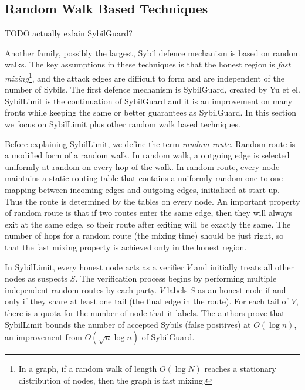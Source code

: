 \subsection{Random Walk Based Techniques}\label{sec:random-walk}
TODO actually exlain SybilGuard?

Another family, possibly the largest, Sybil defence mechanism is based on random
walks. The key assumptions in these techniques is that the honest region is
\emph{fast mixing}\footnote{In a graph, if a random walk of length $O(\log{N})$
  reaches a stationary distribution of nodes, then the graph is fast mixing.},
and the attack edges are difficult to form and are independent of the number of
Sybils. The first defence mechanism is SybilGuard\cite{yu2006sybilguard},
created by Yu et el. SybilLimit\cite{yu2008sybillimit} is the continuation of
SybilGuard and it is an improvement on many fronts while keeping the same or
better guarantees as SybilGuard. In this section we focus on SybilLimit plus
other random walk based techniques.

Before explaining SybilLimit, we define the term \emph{random route}. Random
route is a modified form of a random walk. In random walk, a outgoing edge is
selected uniformly at random on every hop of the walk. In random route, every
node maintains a static routing table that contains a uniformly random
one-to-one mapping between incoming edges and outgoing edges, initialised at
start-up. Thus the route is determined by the tables on every node. An important
property of random route is that if two routes enter the same edge, then they
will always exit at the same edge, so their route after exiting will be exactly
the same. The number of hops for a random route (the mixing time) should be just
right, so that the fast mixing property is achieved only in the honest region.

In SybilLimit, every honest node acts as a verifier $V$ and initially treats all
other nodes as suspects $S$. The verification process begins by performing
multiple independent random routes by each party. $V$ labels $S$ as an honest
node if and only if they share at least one tail (the final edge in the route).
For each tail of $V$, there is a quota for the number of node that it labels.
The authors prove that SybilLimit bounds the number of accepted Sybils (false
positives) at $O(\log{n})$, an improvement from $O(\sqrt{n} \log{n})$ of
SybilGuard.

